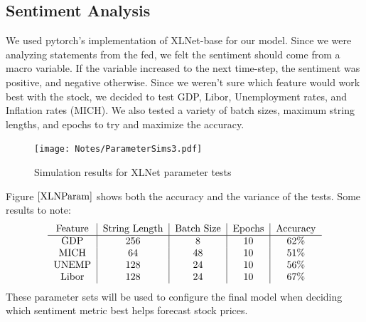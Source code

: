 \documentclass{article}
\begin{document}
\subsection{Sentiment Analysis}
We used pytorch's implementation of XLNet-base for our model. Since we were analyzing statements from the fed, we felt the sentiment should come from a macro variable. If the variable increased to the next time-step, the sentiment was positive, and negative otherwise. Since we weren't sure which feature would work best with the stock, we decided to test GDP, Libor, Unemployment rates, and Inflation rates (MICH). We also tested a variety of batch sizes, maximum string lengths, and epochs to try and maximize the accuracy.
\begin{figure}[ht]
    \centering
    \texttt{[image: Notes/ParameterSims3.pdf]}
    \caption{Simulation results for XLNet parameter tests}
    \label{XLNParam}
\end{figure}
Figure $\ref{XLNParam}$ shows both the accuracy and the variance of the tests. Some results to note:
$$\begin{tabular}{c|c|c|c|c}
    Feature & String Length & Batch Size & Epochs & Accuracy \\ \hline
    GDP & 256 & 8 & 10 & 62\% \\
    MICH & 64 & 48 & 10 & 51\% \\
    UNEMP & 128 & 24 & 10 & 56\% \\
    Libor & 128 & 24 & 10 & 67\% \\
\end{tabular}$$
These parameter sets will be used to configure the final model when deciding which sentiment metric best helps forecast stock prices. 
\end{document}
